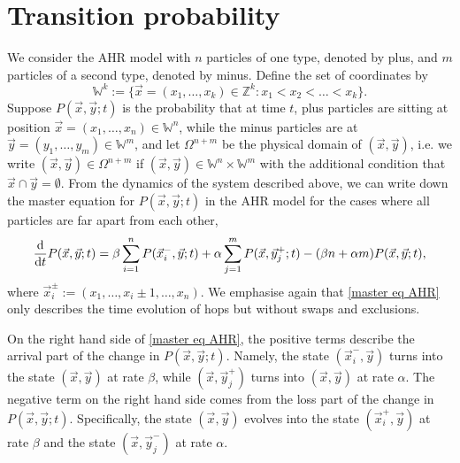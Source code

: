 \documentclass[cmp]{svjour}
\numberwithin{theorem}{section}
\numberwithin{equation}{section}
\def\dd{{\rm d}}
\begin{document}
\section{Transition probability}
\label{se:greenfunction}
We consider the AHR model with $n$ particles of one type, denoted by plus, and $m$ particles of a second type, denoted by minus. Define the set of coordinates by
\begin{equation}
\label{coordinates}
\mathbb{W}^k:= \{\vec{x}=(x_1,\dots,x_k)\in\mathbb{Z}^k: x_1<x_2<\dots<x_k\}.
\end{equation}
Suppose $P(\vec{x},\vec{y};t)$ is the probability that at time $t$, plus particles are sitting at position $\vec{x}=(x_1,\dots,x_n)\in \mathbb{W}^n$, while the minus particles are at $\vec{y}=(y_1,\dots,y_m)\in \mathbb{W}^m$, and let $\Omega^{n+m}$ be the physical domain of $(\vec{x},\vec{y})$, i.e. we write $(\vec{x},\vec{y}) \in \Omega^{n+m}$ if $(\vec{x},\vec{y})\in \mathbb{W}^n \times \mathbb{W}^m$ with the additional condition that $\vec{x} \cap \vec{y} = \emptyset$. From the dynamics of the system described above, we can write down the master equation for $P(\vec{x},\vec{y};t)$ in the AHR model for the cases where all particles are far apart from each other,
\begin{align}
\label{master eq AHR}
\frac{\dd}{\dd t}P(\vec{x},\vec{y};t)
=
\beta\sum_{i=1}^{n}P(\vec{x}_i^-,\vec{y};t)+
\alpha\sum_{j=1}^{m}P(\vec{x},\vec{y}_j^+;t)
-(\beta n+\alpha m)P(\vec{x},\vec{y};t),
\end{align}
where $\vec{x}_i^{\pm}:=(x_1,\dots,x_i {\pm} 1,\dots,x_n)$. We emphasise again that \eqref{master eq AHR} only describes the time evolution of hops but without swaps and exclusions.

On the right hand side of \eqref{master eq AHR}, the positive terms describe the arrival part of the change in $P(\vec{x},\vec{y};t)$. Namely, the state $(\vec{x}_i^-,\vec{y})$ turns into the state $(\vec{x},\vec{y})$ at rate $\beta$, while $(\vec{x},\vec{y}_j^+)$ turns into $(\vec{x},\vec{y})$ at rate $\alpha$. The negative term on the right hand side comes from the loss part of the change in $P(\vec{x},\vec{y};t)$. Specifically, the state $(\vec{x},\vec{y})$ evolves into the state $(\vec{x}_i^+,\vec{y})$ at rate $\beta$ and the state $(\vec{x},\vec{y}_j^-)$ at rate $\alpha$.
\end{document}
